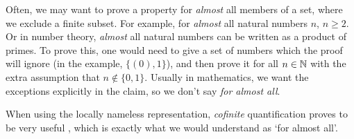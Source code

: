 Often, we may want to prove a property for \textit{almost} all members of a set, where we exclude a
finite subset. For example, for \textit{almost} all natural numbers $n$, $n \geq 2$. Or in number
theory, \textit{almost} all natural numbers can be written as a product of primes. To prove this,
one would need to give a set of numbers which the proof will ignore (in the example, $\{ (0), 1
\}$), and then prove it for all $n \in \operatorname{\mathbb{N}}$ with the extra assumption that $n \not \in \{0, 1\}$.
Usually in mathematics, we want the exceptions explicitly in the claim, so we don't say \textit{for
almost all}.

When using the locally nameless representation, \textit{cofinite} quantification proves to be very
useful \citep{aydemir_engineering_2008}, which is exactly what we would understand as `for almost
all'.

